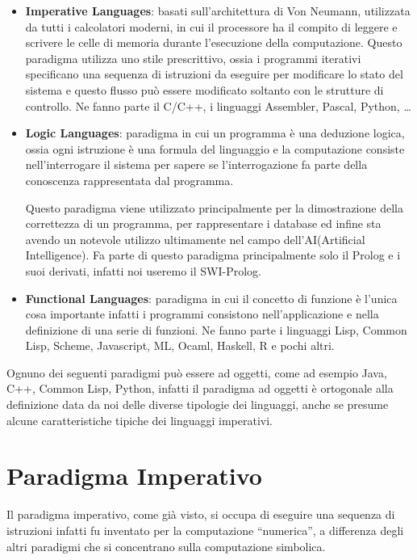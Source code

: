 \documentclass[a4paper]{book}
\begin{document}
\begin{itemize}
\item \textbf{Imperative Languages}: basati sull'architettura di Von Neumann, utilizzata da tutti i calcolatori moderni,
      in cui il processore ha il compito di leggere e scrivere le celle di memoria durante l'esecuzione della computazione.\newline
      Questo paradigma utilizza uno stile prescrittivo, ossia i programmi iterativi specificano una sequenza
      di istruzioni da eseguire per modificare lo stato del sistema e questo flusso può essere modificato soltanto con
      le strutture di controllo.\newline
      Ne fanno parte il C/C++, i linguaggi Assembler, Pascal, Python, \dots
\item \textbf{Logic Languages}: paradigma in cui un programma è una deduzione logica, ossia ogni istruzione è una formula del linguaggio
  e la computazione consiste nell'interrogare il sistema per sapere se l'interrogazione fa parte della conoscenza rappresentata dal programma.

      Questo paradigma viene utilizzato principalmente per la dimostrazione della correttezza di un programma, per rappresentare i database
      ed infine sta avendo un notevole utilizzo ultimamente nel campo dell'AI(Artificial Intelligence).\newline
      Fa parte di questo paradigma principalmente solo il Prolog e i suoi derivati, infatti noi useremo il SWI-Prolog.
\item \textbf{Functional Languages}: paradigma in cui il concetto di funzione è l'unica cosa importante infatti i programmi
      consistono nell'applicazione e nella definizione di una serie di funzioni.\newline
      Ne fanno parte i linguaggi Lisp, Common Lisp, Scheme, Javascript, ML, Ocaml, Haskell, R e pochi altri.
\end{itemize}
Ognuno dei seguenti paradigmi può essere ad oggetti, come ad esempio Java, C++, Common Lisp, Python,
infatti il paradigma ad oggetti è ortogonale alla definizione data da noi delle diverse tipologie dei linguaggi,
anche se presume alcune caratteristiche tipiche dei linguaggi imperativi.

\section{Paradigma Imperativo}
Il paradigma imperativo, come già visto, si occupa di eseguire una sequenza di istruzioni
infatti fu inventato per la computazione ``numerica'', a differenza degli altri paradigmi che si concentrano sulla computazione simbolica.
\end{document}
